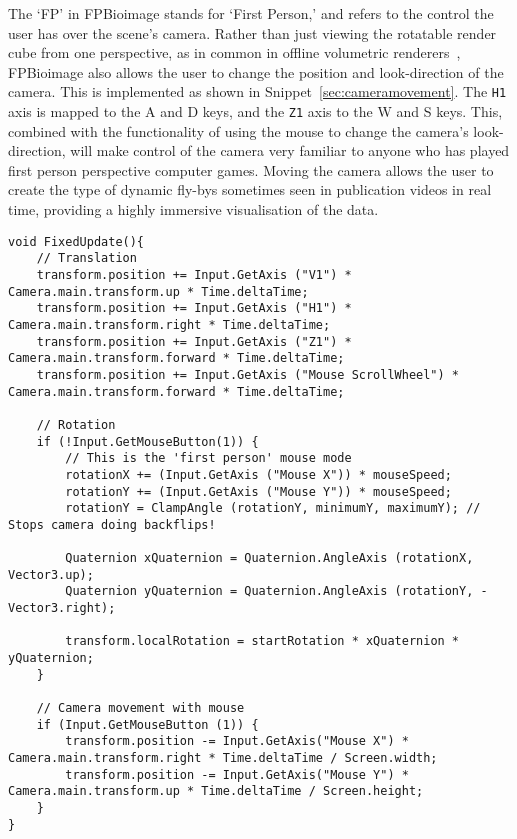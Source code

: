 The `FP' in FPBioimage stands for `First Person,' and refers to the control the user has over the scene's camera.
Rather than just viewing the rotatable render cube from one perspective, as in common in offline volumetric renderers~\cite{schindelin2012fiji, de2012icy, imaris}, FPBioimage also allows the user to change the position and look-direction of the camera.
This is implemented as shown in Snippet~\ref{sec:cameramovement}.
The \texttt{H1} axis is mapped to the A and D keys, and the \texttt{Z1} axis to the W and S keys.
This, combined with the functionality of using the mouse to change the camera's look-direction, will make control of the camera very familiar to anyone who has played first person perspective computer games.
Moving the camera allows the user to create the type of dynamic fly-bys sometimes seen in publication videos in real time, providing a highly immersive visualisation of the data.

\begin{lstlisting}[language={[Sharp]c}, label={sec:cameramovement}, caption={C\# code using built-in Unity functions for moving the camera in a first-person manner.}]
void FixedUpdate(){
	// Translation
	transform.position += Input.GetAxis ("V1") * Camera.main.transform.up * Time.deltaTime;
	transform.position += Input.GetAxis ("H1") * Camera.main.transform.right * Time.deltaTime;
	transform.position += Input.GetAxis ("Z1") * Camera.main.transform.forward * Time.deltaTime;
	transform.position += Input.GetAxis ("Mouse ScrollWheel") * Camera.main.transform.forward * Time.deltaTime;

	// Rotation
	if (!Input.GetMouseButton(1)) {
		// This is the 'first person' mouse mode
		rotationX += (Input.GetAxis ("Mouse X")) * mouseSpeed;
		rotationY += (Input.GetAxis ("Mouse Y")) * mouseSpeed;
		rotationY = ClampAngle (rotationY, minimumY, maximumY); // Stops camera doing backflips!

		Quaternion xQuaternion = Quaternion.AngleAxis (rotationX, Vector3.up);
		Quaternion yQuaternion = Quaternion.AngleAxis (rotationY, -Vector3.right);

		transform.localRotation = startRotation * xQuaternion * yQuaternion;
	}

	// Camera movement with mouse
	if (Input.GetMouseButton (1)) {
		transform.position -= Input.GetAxis("Mouse X") * Camera.main.transform.right * Time.deltaTime / Screen.width;
		transform.position -= Input.GetAxis("Mouse Y") * Camera.main.transform.up * Time.deltaTime / Screen.height;
	}
}
\end{lstlisting}

